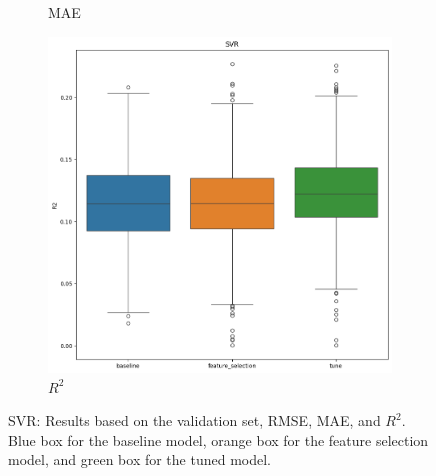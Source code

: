 \documentclass[12pt]{article}
\begin{document}
\begin{figure}[H]
\begin{subfigure}{0.3\textwidth}
        \caption{MAE}
        \label{fig:svr_mae}
    \end{subfigure}
    \begin{subfigure}{0.3\textwidth}
        \centering
        \includegraphics[width=\linewidth]{ims/svr_r2.png}
        \caption{$R^2$}
        \label{fig:svr_r2}
    \end{subfigure}
    \caption{SVR: Results based on the validation set, RMSE, MAE, and $R^2$. Blue
    box for the baseline model, orange box for the feature selection model, and green
    box for the tuned model.}
    \label{fig:svr_results}
\end{figure}
\end{document}
